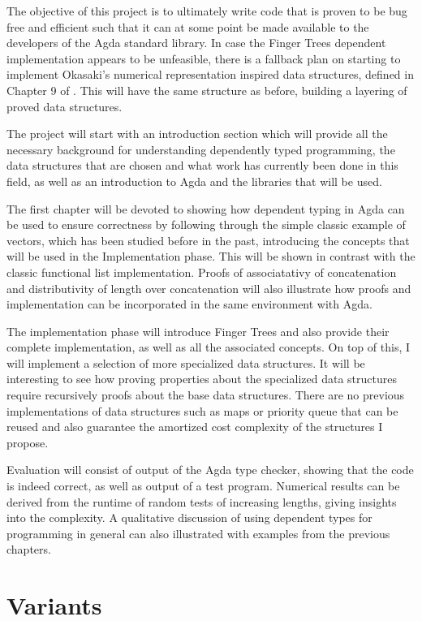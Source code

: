 \documentclass[12pt]{article}
\begin{document}
The objective of this project is to ultimately write code that is proven to be
bug free and efficient such that it can at some point be made available to the
developers of the Agda standard library.
In case the Finger Trees dependent implementation appears to be unfeasible,
there is a fallback plan on starting to implement Okasaki's numerical representation
inspired data structures, defined in Chapter 9 of \cite{okasaki}. This will have the same
structure as before, building a layering of proved data structures.

The project will start with an introduction section which will provide all the
necessary background for understanding dependently typed programming, the
data structures that are chosen and what work has currently been done in this
field, as well as an introduction to Agda and the libraries that will be used.

The first chapter will be devoted to showing how dependent typing in Agda can be
used to ensure correctness by following through the simple classic example of
vectors, which has been studied before in the past, introducing the concepts that
will be used in the Implementation phase. This will be shown in contrast with
the classic functional list implementation. Proofs of associatativy of concatenation
and distributivity of length over concatenation will also illustrate how
proofs and implementation can be incorporated in the same environment with Agda.

The implementation phase will introduce Finger Trees and also provide their complete
implementation, as well as all the associated concepts. On top of this,
I will implement a selection of more specialized data structures. It will
be interesting to see how proving properties about the specialized data structures
require recursively proofs about the base data structures. There are no previous
implementations of data structures such as maps or priority queue that can be reused
and also guarantee the amortized cost complexity of the structures I propose.

Evaluation will consist of output of the Agda type checker, showing that the
code is indeed correct, as well as output of a test program. Numerical results
can be derived from the runtime of random tests of increasing lengths, giving
insights into the complexity.
A qualitative discussion of using dependent types for programming in general
can also illustrated with examples from the previous chapters.

\section*{Variants}
\end{document}
